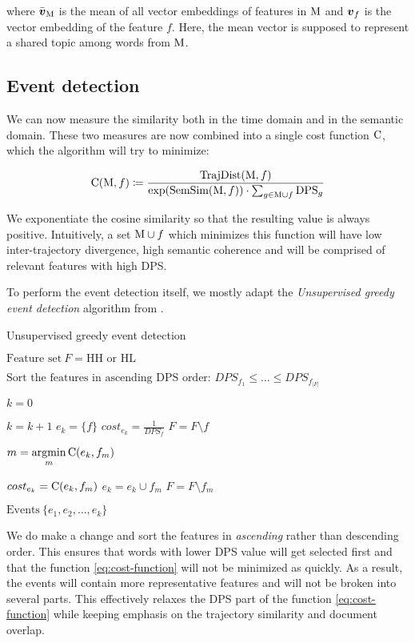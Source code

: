 where $\bar{\embed}_{\featset}$ is the mean of all vector embeddings of features in $\text{M}$ and $\embed_{f}$ is the vector embedding of the feature $f$. Here, the mean vector is supposed to represent a shared topic among words from $\text{M}$.


\subsection{Event detection}

We can now measure the similarity both in the time domain and in the semantic domain. These two measures are now combined into a single cost function $\text{C}$, which the algorithm will try to minimize:

\begin{equation} \label{eq:cost-function}
	\text{C}( \text{M}, f ) \coloneqq \frac{\text{TrajDist}( \text{M}, f )}{\exp(\text{SemSim}( \text{M}, f )) \cdot \sum_{g \in \text{M} \cup f}{\text{DPS}_{g}}}
\end{equation}

We exponentiate the cosine similarity so that the resulting value is always positive. Intuitively, a set $\text{M} \cup f$ which minimizes this function will have low inter-trajectory divergence, high semantic coherence and will be comprised of relevant features with high DPS.

To perform the event detection itself, we mostly adapt the \textit{Unsupervised greedy event detection} algorithm from \cite{event-detection}.

\begin{algorithm}[H]
\begin{algorithmic}[1]
\caption{Unsupervised greedy event detection}
\Input $\text{Feature set} ~ F = \text{HH or HL}$

\State $\text{Sort the features in ascending DPS order: } DPS_{f_{1}} \leq \dots \leq DPS_{f_{\left\vert F \right\vert}}$

\State $k = 0$

	\State $k = k + 1$	
	\State $e_{k} = \{ f \}$
	\State $cost_{e_{k}} = \frac{1}{DPS_{f}}$
	\State $F = F \setminus f$
	
		\State $m = \operatorname*{argmin}\limits_{m}{\text{C}( e_{k}, f_{m} )}$

			\State $cost_{e_{k}} = \text{C}( e_{k}, f_{m} )$
			\State $e_{k} = e_{k} \cup f_{m}$
			\State $F = F \setminus f_{m}$
		\Else
			\Break
		\EndIf
	\EndWhile
\EndFor

\Output $\text{Events} ~ \{ e_{1}, e_{2}, \dots, e_{k} \}$
\end{algorithmic}
\end{algorithm}

We do make a change and sort the features in \textit{ascending} rather than descending order. This ensures that words with lower DPS value will get selected first and that the function \ref{eq:cost-function} will not be minimized as quickly. As a result, the events will contain more representative features and will not be broken into several parts. This effectively relaxes the DPS part of the function \ref{eq:cost-function} while keeping emphasis on the trajectory similarity and document overlap.